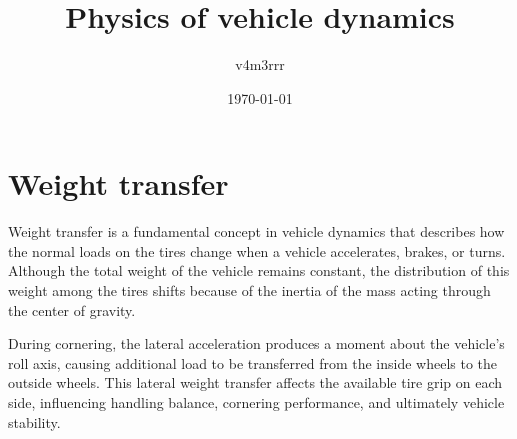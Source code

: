 \documentclass{article}
\title{Physics of vehicle dynamics}
\author{v4m3rrr}
\date{\today}
\begin{document}
	\maketitle
	\tableofcontents
	\newpage
	\section{Weight transfer}
	Weight transfer is a fundamental concept in vehicle dynamics that describes how the normal loads on the tires change when a vehicle accelerates, brakes, or turns. Although the total weight of the vehicle remains constant, the distribution of this weight among the tires shifts because of the inertia of the mass acting through the center of gravity.
	
	During cornering, the lateral acceleration produces a moment about the vehicle’s roll axis, causing additional load to be transferred from the inside wheels to the outside wheels. This lateral weight transfer affects the available tire grip on each side, influencing handling balance, cornering performance, and ultimately vehicle stability.
\end{document}
